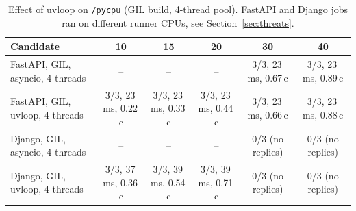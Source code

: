 \begin{table}[t]
\caption{Effect of uvloop on \texttt{/pycpu} (GIL build, 4-thread pool). FastAPI and Django jobs ran on different runner CPUs, see Section~\ref{sec:threats}.}
\label{tab:uvloop}
\centering\small
\begin{tabular}{lccccc}
\toprule
Candidate & 10 & 15 & 20 & 30 & 40 \\
\midrule
FastAPI, GIL, asyncio, 4 threads & -- & -- & -- & 3/3, 23\,ms, 0.67\,c & 3/3, 23\,ms, 0.89\,c \\
FastAPI, GIL, uvloop, 4 threads & 3/3, 23\,ms, 0.22\,c & 3/3, 23\,ms, 0.33\,c & 3/3, 23\,ms, 0.44\,c & 3/3, 23\,ms, 0.66\,c & 3/3, 23\,ms, 0.88\,c \\
Django, GIL, asyncio, 4 threads & -- & -- & -- & 0/3 (no replies) & 0/3 (no replies) \\
Django, GIL, uvloop, 4 threads & 3/3, 37\,ms, 0.36\,c & 3/3, 39\,ms, 0.54\,c & 3/3, 39\,ms, 0.71\,c & 0/3 (no replies) & 0/3 (no replies) \\
\bottomrule
\end{tabular}
\end{table}
